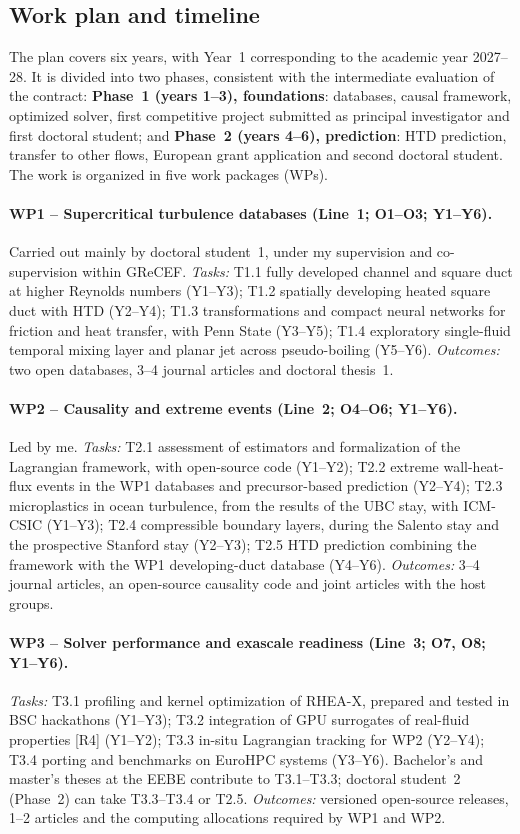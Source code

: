 \documentclass[11pt]{article}
\begin{document}
\subsection{Work plan and timeline}\label{sec:workplan}
The plan covers six years, with Year~1 corresponding to the academic year 2027--28. It is
divided into two phases, consistent with the intermediate evaluation of the contract:
\textbf{Phase~1 (years 1--3), foundations}: databases, causal framework, optimized solver,
first competitive project submitted as principal investigator and first doctoral
student; and \textbf{Phase~2
(years 4--6), prediction}: HTD prediction, transfer to other flows, European grant
application and second doctoral student. The work is organized in five work packages (WPs).

\paragraph{WP1 -- Supercritical turbulence databases (Line~1; O1--O3; Y1--Y6).} Carried out
mainly by doctoral student~1, under my supervision and co-supervision within GReCEF.
\emph{Tasks:} T1.1 fully developed channel and square duct at higher Reynolds numbers
(Y1--Y3); T1.2 spatially developing heated square duct with HTD (Y2--Y4); T1.3 transformations
and compact neural networks for friction and heat transfer, with Penn State (Y3--Y5); T1.4
exploratory single-fluid temporal mixing layer and planar jet across pseudo-boiling (Y5--Y6).
\emph{Outcomes:} two open databases, 3--4 journal articles and doctoral thesis~1.

\paragraph{WP2 -- Causality and extreme events (Line~2; O4--O6; Y1--Y6).} Led by me.
\emph{Tasks:} T2.1 assessment of estimators and formalization of the Lagrangian framework,
with open-source code (Y1--Y2); T2.2 extreme wall-heat-flux events in the WP1 databases and
precursor-based prediction (Y2--Y4); T2.3 microplastics in ocean turbulence, from the results
of the UBC stay, with ICM-CSIC (Y1--Y3); T2.4 compressible boundary layers, during the
Salento stay and the prospective Stanford stay (Y2--Y3); T2.5 HTD prediction combining the
framework with the WP1 developing-duct database (Y4--Y6).
\emph{Outcomes:} 3--4 journal articles, an open-source causality code and joint articles with
the host groups.

\paragraph{WP3 -- Solver performance and exascale readiness (Line~3; O7, O8; Y1--Y6).}
\emph{Tasks:} T3.1 profiling and kernel optimization of RHEA-X, prepared and tested in BSC
hackathons (Y1--Y3); T3.2 integration of GPU surrogates of real-fluid properties [R4] (Y1--Y2);
T3.3 in-situ Lagrangian tracking for WP2 (Y2--Y4); T3.4 porting and benchmarks on EuroHPC
systems (Y3--Y6). Bachelor's and master's theses at the EEBE contribute to T3.1--T3.3;
doctoral student~2 (Phase~2) can take T3.3--T3.4 or T2.5.
\emph{Outcomes:} versioned open-source releases, 1--2 articles and the computing allocations
required by WP1 and WP2.
\end{document}
